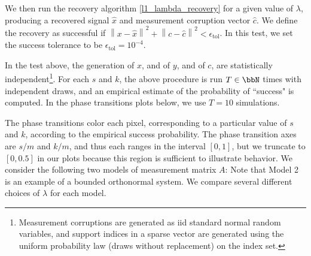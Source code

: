 We then run the recovery algorithm \eqref{l1_lambda_recovery} for a given value of $\lambda$, producing a recovered signal $\widehat{x}$ and measurement corruption vector $\widehat{c}$. We define the recovery as successful if $\left\| x - \widehat{x} \right\|^2 + \left\| c - \widehat{c} \right\|^2 < \epsilon_{\mathrm{tol}}$. In this test, we set the success tolerance to be $\epsilon_{\mathrm{tol}} = 10^{-4}$.

In the test above, the generation of $x$, and of $y$, and of $c$, are statistically independent\footnote{Measurement corruptions are generated as iid standard normal random variables, and support indices in a sparse vector are generated using the uniform probability law (draws without replacement) on the index set.}. For each $s$ and $k$, the above procedure is run $T \in \bbN$ times with independent draws, and an empirical estimate of the probability of ``success" is computed. In the phase transitions plots below, we use $T = 10$ simulations.

The phase transitions color each pixel, corresponding to a particular value of $s$ and $k$, according to the empirical success probability. The phase transition axes are $s/m$ and $k/m$, and thus each ranges in the interval $[0, 1]$, but we truncate to $[0, 0.5]$ in our plots because this region is sufficient to illustrate behavior.  We consider the following two models of measurement matrix $A$:
Note that Model 2 is an example of a bounded orthonormal system.  We compare several different choices of $\lambda$ for each model.


